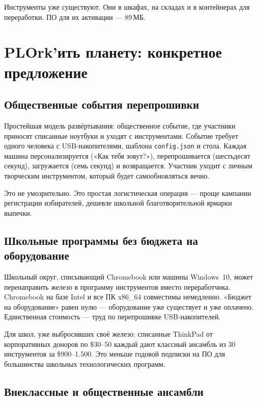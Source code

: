 \documentclass[10pt,letterpaper,twocolumn]{article}
\begin{document}
Инструменты уже существуют. Они в шкафах, на складах и в контейнерах для переработки. ПО для их активации --- 89\,МБ.


\section{PLOrk'ить планету: конкретное предложение}
\label{sec:proposal}

\subsection{Общественные события перепрошивки}

Простейшая модель развёртывания: общественное событие, где участники приносят списанные ноутбуки и уходят с инструментами. Событие требует одного человека с USB-накопителями, шаблона \texttt{config.json} и стола. Каждая машина персонализируется («Как тебя зовут?»), перепрошивается (шестьдесят секунд), загружается (семь секунд) и возвращается. Участник уходит с личным творческим инструментом, который будет самообновляться вечно.

Это не умозрительно. Это простая логистическая операция --- проще кампании регистрации избирателей, дешевле школьной благотворительной ярмарки выпечки.

\subsection{Школьные программы без бюджета на оборудование}

Школьный округ, списывающий Chromebook или машины Windows~10, может перенаправить железо в программу инструментов вместо переработчика. Chromebook на базе Intel и все ПК x86\_64 совместимы немедленно. «Бюджет на оборудование» равен нулю --- оборудование уже существует и уже оплачено. Единственная стоимость --- труд по перепрошивке USB-накопителей.

Для школ, уже выбросивших своё железо: списанные ThinkPad от корпоративных доноров по \$30--50 каждый дают классный ансамбль из 30 инструментов за \$900--1.500. Это меньше годовой подписки на ПО для большинства школьных технологических программ.

\subsection{Внеклассные и общественные ансамбли}
\end{document}

